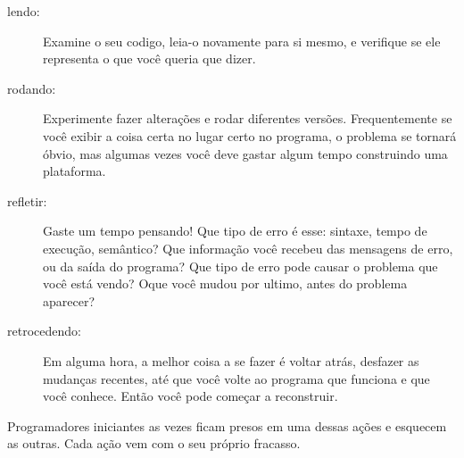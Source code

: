 \begin{description}

\item[lendo:] Examine o seu codigo, leia-o novamente para si mesmo, e 
verifique se ele representa o que você queria que dizer.

\item[rodando:] Experimente fazer alterações e rodar diferentes versões.
Frequentemente se você exibir a coisa certa no lugar certo no programa, o
problema se tornará óbvio, mas algumas vezes você deve gastar algum tempo
construindo uma plataforma.

\item[refletir:] Gaste um tempo pensando! Que tipo de erro é esse: sintaxe,
tempo de execução, semântico? Que informação você recebeu das mensagens de
erro, ou da saída do programa? Que tipo de erro pode causar o problema que
você está vendo? Oque você mudou por ultimo, antes do problema aparecer?

\item[retrocedendo:] Em alguma hora, a melhor coisa a se fazer é voltar atrás,
desfazer as mudanças recentes, até que você volte ao programa que funciona e
que você conhece. Então você pode começar a reconstruir.

\end{description}

Programadores iniciantes as vezes ficam presos em uma dessas ações e esquecem
as outras. Cada ação vem com o seu próprio fracasso. 

